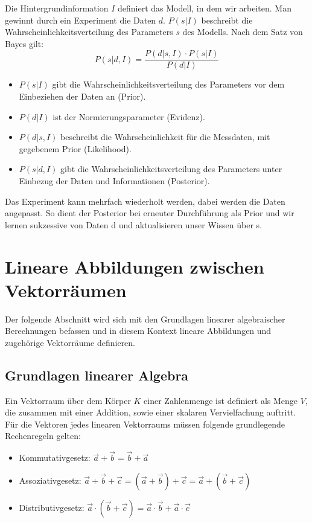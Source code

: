 \documentclass[]{dsadokumentation}
\begin{document}
Die Hintergrundinformation $I$ definiert das Modell, in dem wir arbeiten. Man gewinnt durch ein Experiment die Daten $d$. $P(s|I)$ beschreibt die Wahrscheinlichkeitsverteilung des Parameters $s$ des Modells. Nach dem Satz von Bayes gilt:
\begin{equation}
  P(s|d,I) = \frac{P(d|s,I)\cdot P(s|I)}{P(d|I)}
\end{equation}

\begin{itemize}
  \item $P(s|I)$ gibt die Wahrscheinlichkeitsverteilung des Parameters vor dem Einbeziehen der Daten an (Prior).
  \item $P(d|I)$ ist der Normierungsparameter (Evidenz).
  \item $P(d|s,I)$ beschreibt die Wahrscheinlichkeit für die Messdaten, mit gegebenem Prior (Likelihood).
  \item $P(s|d,I)$ gibt die Wahrscheinlichkeitsverteilung des Parameters unter Einbezug der Daten und Informationen (Posterior).
\end{itemize}

Das Experiment kann mehrfach wiederholt werden, dabei werden die Daten angepasst. So dient der Posterior bei erneuter Durchführung als Prior und wir lernen sukzessive von Daten d und aktualisieren unser Wissen über s.

\section{Lineare Abbildungen zwischen Vektorräumen}\label{k4.2.ch.linalg}
Der folgende Abschnitt wird sich mit den Grundlagen linearer algebraischer Berechnungen befassen und in diesem Kontext lineare Abbildungen und zugehörige Vektorräume definieren.

\subsection{Grundlagen linearer Algebra}
Ein Vektorraum über dem Körper $K$ einer Zahlenmenge ist definiert als Menge $V$, die zusammen mit einer Addition, sowie einer skalaren Vervielfachung auftritt. Für die Vektoren jedes linearen Vektorraums müssen folgende grundlegende Rechenregeln gelten:
\begin{itemize}
  \item Kommutativgesetz: $\vec{a} + \vec{b} = \vec{b} + \vec{a}$
  \item Assoziativgesetz: $\vec{a} + \vec{b} + \vec{c} = (\vec{a} +\vec{b}) + \vec{c} = \vec{a} + (\vec{b} +\vec{c})$
  \item Distributivgesetz: $\vec{a} \cdot (\vec{b} + \vec{c}) = \vec{a} \cdot \vec{b} + \vec{a} \cdot \vec{c}$
\end{itemize}
\end{document}
